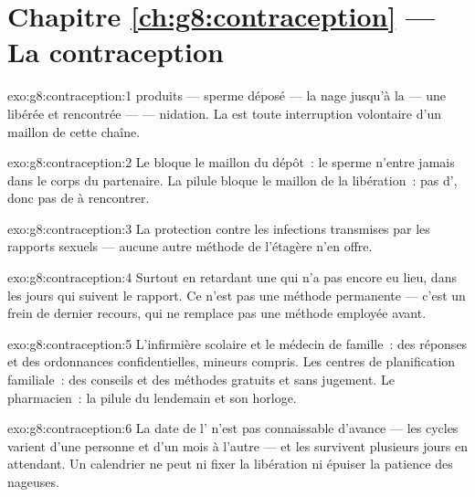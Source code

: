 \section*{Chapitre \ref{ch:g8:contraception} --- La contraception}

\begin{solution}{exo:g8:contraception:1}
 produits --- sperme déposé --- la nage jusqu'à la  ---
une  libérée et rencontrée ---  --- nidation.
La  est toute interruption volontaire d'un maillon de
cette chaîne.
\end{solution}

\begin{solution}{exo:g8:contraception:2}
Le  bloque le maillon du dépôt~: le sperme n'entre jamais
dans le corps du partenaire. La pilule bloque le maillon de la
libération~: pas d', donc pas de  à rencontrer.
\end{solution}

\begin{solution}{exo:g8:contraception:3}
La protection contre les infections transmises par les rapports
sexuels --- aucune autre méthode de l'étagère n'en offre.
\end{solution}

\begin{solution}{exo:g8:contraception:4}
Surtout en retardant une  qui n'a pas encore eu lieu, dans
les jours qui suivent le rapport. Ce n'est pas une méthode
permanente --- c'est un frein de dernier recours, qui ne remplace
pas une méthode employée avant.
\end{solution}

\begin{solution}{exo:g8:contraception:5}
L'infirmière scolaire et le médecin de famille~: des réponses et des
ordonnances confidentielles, mineurs compris. Les centres de
planification familiale~: des conseils et des méthodes gratuits et
sans jugement. Le pharmacien~: la pilule du lendemain et son horloge.
\end{solution}

\begin{solution}{exo:g8:contraception:6}
La date de l' n'est pas connaissable d'avance --- les
cycles varient d'une personne et d'un mois à l'autre --- et les
 survivent plusieurs jours en attendant. Un calendrier
ne peut ni fixer la libération ni épuiser la patience des nageuses.
\end{solution}

